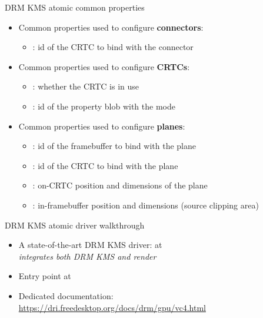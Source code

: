 \begin{frame}[fragile]{DRM KMS atomic common properties}
  \begin{itemize}
  \item Common properties used to configure \textbf{connectors}:
    \begin{itemize}
    \item {}: id of the CRTC to bind with the connector
    \end{itemize}
  \item Common properties used to configure \textbf{CRTCs}:
    \begin{itemize}
    \item {}: whether the CRTC is in use
    \item {}: id of the property blob with the  mode
    \end{itemize}
  \item Common properties used to configure \textbf{planes}:
    \begin{itemize}
    \item {}: id of the framebuffer to bind with the plane
    \item {}: id of the CRTC to bind with the plane
    \item {}: on-CRTC position and dimensions of the plane
    \item {}: in-framebuffer position and dimensions (source clipping area)
    \end{itemize}
  \end{itemize}
\end{frame}

\begin{frame}[fragile]{DRM KMS atomic driver walkthrough}
  \begin{itemize}
  \item A state-of-the-art DRM KMS driver:  at \\
  \textit{integrates both DRM KMS and render}
  \item Entry point at 
  \item Dedicated documentation: \url{https://dri.freedesktop.org/docs/drm/gpu/vc4.html}
  \end{itemize}
\end{frame}

